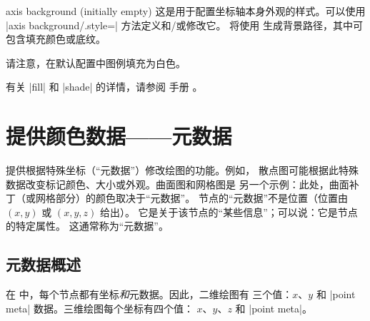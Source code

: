 \begin{pgfplotskey}{axis background (initially empty)}
    这是用于配置坐标轴本身外观的样式。可以使用
    |axis background/.style=| 方法定义和/或修改它。
    将使用  生成背景路径，其中可包含填充颜色或底纹。
\pgfplotsexpensiveexample
\begin{codeexample}[]
\end{codeexample}

    请注意，在默认配置中图例填充为白色。
\begin{codeexample}[]
\end{codeexample}
    有关 |fill| 和 |shade| 的详情，请参阅 \Tikz{} 手册
    \cite{tikz}。
\end{pgfplotskey}


\section{提供颜色数据——元数据}
\label{sec:pgfplots:point:meta}

\PGFPlots{} 提供根据特殊坐标（``元数据''）修改绘图的功能。例如，
散点图可能根据此特殊数据改变标记颜色、大小或外观。曲面图和网格图是
另一个示例：此处，曲面补丁（或网格部分）的颜色取决于``元数据''。
节点的``元数据''不是位置（位置由 $(x,y)$ 或 $(x,y,z)$ 给出）。
它是关于该节点的``某些信息''；可以说：它是节点的特定属性。
这通常称为``元数据''。


\subsection{元数据概述}

在 \PGFPlots{} 中，每个节点都有坐标\emph{和}元数据。因此，二维绘图有
三个值：$x$、$y$ 和 |point meta| 数据。三维绘图每个坐标有四个值：
$x$、$y$、$z$ 和 |point meta|。

